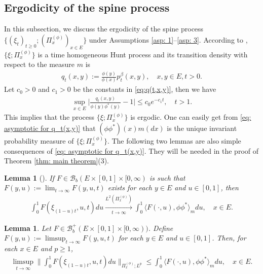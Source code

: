 \documentclass[12pt,a4paper]{amsart}
\newtheorem{lem}[thm]{Lemma}
\theoremstyle{definition}
\numberwithin{equation}{section}
\begin{document}
\subsection{Ergodicity of the spine process}
\label{sec: Ergodicity}
In this subsection, we discuss the ergodicity of the spine process $\{(\xi_t)_{t\geq 0}; (\Pi^{(\phi)}_x)_{x\in E}\}$ under Assumptions \ref{asp: 1}--\ref{asp: 3}.
According to \cite{KimSong2008Intrinsic}, $\{\xi; \Pi^{(\phi)}_x\}$ is a time homogeneous Hunt process and its transition density with respect to the measure $m$ is
\begin{align}
	q_t(x,y) := \frac{\phi(y)}{\phi(x)} p^\beta_t(x,y),
	\quad x,y\in E, t>0.
\end{align}
Let $c_0>0$ and $c_1>0$ be the constants  in \eqref{eq:q(t,x,y)}, then we have
\begin{align}\label{eq: asymptotic for q_t(x,y)}
	\sup_{x\in E} \Big| \frac{q_t(x,y)}{\phi(y)\phi^*(y)} - 1\Big|
	\leq c_0 e^{-c_1 t},
	\quad t > 1.
\end{align}
This implies that the process $\{\xi; \Pi^{(\phi)}_x\}$ is ergodic.
One can easily get from \eqref{eq: asymptotic for q_t(x,y)} that $(\phi\phi^*)(x)m(dx)$ is the unique invariant probability measure of $\{\xi; \Pi^{(\phi)}_x\}$.
The following two lemmas are also simple consequences of \eqref{eq: asymptotic for q_t(x,y)}.
They will be needed in the proof of  Theorem \ref{thm: main theorem}(3).
\begin{lem}[{\cite[Lemma 5.1]{RenSongSun2017Spine}}] \label{lem: ergodicity of the underlying process}
If $F\in \mathscr B_b(E\times [0,1]\times [0,\infty)$ is
such that $F(y,u):= \lim_{t\to \infty} F(y,u,t)$ exists for each $y\in E$ and $u \in [0,1]$, then
\begin{align}
	\int_0^1 F(\xi_{(1-u)t},u,t) du
	\xrightarrow[t\to \infty]{ L^2(\Pi_x^{(\phi)})}
	\int_0^1 \langle F(\cdot , u), \phi\phi^*\rangle_m du,
	\quad x\in E.
\end{align}
\end{lem}
\begin{lem}\label{lem: Fatou-ergodic lemma for the uderlying process}
  Let $F\in \mathscr B^+_b(E\times [0,1]\times [0,\infty))$.
	Define $F(y,u):= \limsup_{t\to \infty} F(y,u,t)$ for each $y\in E$ and $u \in [0,1]$.
	Then, for each $x\in E$ and $p \geq 1$,
\begin{align}
	\limsup_{ t \to \infty}  \Big\| \int_0^1 F(\xi_{(1-u) t },u,t) du  \Big\|_{\Pi_x^{(\phi)};L^p}
	\leq \int_0^1 \langle F(\cdot, u), \phi \phi^*\rangle_m du,
	\quad x\in E.
\end{align}
\end{lem}
\end{document}
